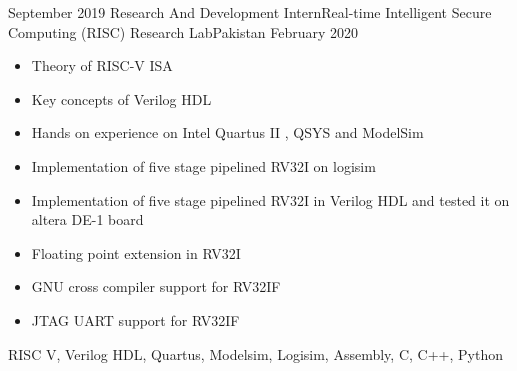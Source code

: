 \begin{experiences}
    \experience
    {September 2019}   {Research And Development Intern}{Real-time Intelligent Secure Computing (RISC) Research Lab}{Pakistan}
    {February 2020} {
    \begin{itemize}
        \item Theory of RISC-V ISA
        \item Key concepts of Verilog HDL
        \item Hands on experience on Intel Quartus II , QSYS and ModelSim
        \item Implementation of five stage pipelined RV32I on logisim
        \item Implementation of five stage pipelined RV32I in Verilog HDL and tested it on altera DE-1 board
        \item Floating point extension in RV32I 
        \item GNU cross compiler support for RV32IF
        \item JTAG UART support for RV32IF                                                      
    \end{itemize}
    }
    {RISC V, Verilog HDL, Quartus, Modelsim, Logisim, Assembly, C, C++, Python}
  \emptySeparator
  
  

\end{experiences}
